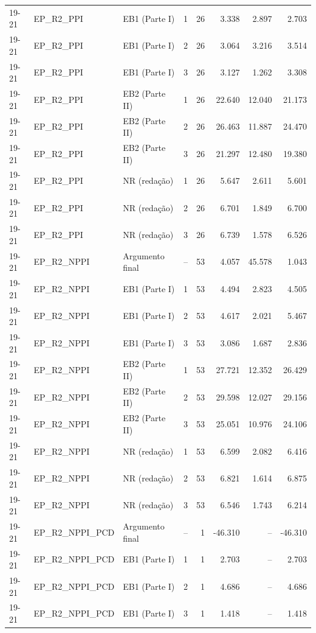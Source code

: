 \begin{longtable}{lllcrrrr}
19-21 & EP\_R2\_PPI & EB1 (Parte I) & 1 & 26 & 3.338 & 2.897 & 2.703 \\
19-21 & EP\_R2\_PPI & EB1 (Parte I) & 2 & 26 & 3.064 & 3.216 & 3.514 \\
19-21 & EP\_R2\_PPI & EB1 (Parte I) & 3 & 26 & 3.127 & 1.262 & 3.308 \\
19-21 & EP\_R2\_PPI & EB2 (Parte II) & 1 & 26 & 22.640 & 12.040 & 21.173 \\
19-21 & EP\_R2\_PPI & EB2 (Parte II) & 2 & 26 & 26.463 & 11.887 & 24.470 \\
19-21 & EP\_R2\_PPI & EB2 (Parte II) & 3 & 26 & 21.297 & 12.480 & 19.380 \\
19-21 & EP\_R2\_PPI & NR (redação) & 1 & 26 & 5.647 & 2.611 & 5.601 \\
19-21 & EP\_R2\_PPI & NR (redação) & 2 & 26 & 6.701 & 1.849 & 6.700 \\
19-21 & EP\_R2\_PPI & NR (redação) & 3 & 26 & 6.739 & 1.578 & 6.526 \\
19-21 & EP\_R2\_NPPI & Argumento final & -- & 53 & 4.057 & 45.578 & 1.043 \\
19-21 & EP\_R2\_NPPI & EB1 (Parte I) & 1 & 53 & 4.494 & 2.823 & 4.505 \\
19-21 & EP\_R2\_NPPI & EB1 (Parte I) & 2 & 53 & 4.617 & 2.021 & 5.467 \\
19-21 & EP\_R2\_NPPI & EB1 (Parte I) & 3 & 53 & 3.086 & 1.687 & 2.836 \\
19-21 & EP\_R2\_NPPI & EB2 (Parte II) & 1 & 53 & 27.721 & 12.352 & 26.429 \\
19-21 & EP\_R2\_NPPI & EB2 (Parte II) & 2 & 53 & 29.598 & 12.027 & 29.156 \\
19-21 & EP\_R2\_NPPI & EB2 (Parte II) & 3 & 53 & 25.051 & 10.976 & 24.106 \\
19-21 & EP\_R2\_NPPI & NR (redação) & 1 & 53 & 6.599 & 2.082 & 6.416 \\
19-21 & EP\_R2\_NPPI & NR (redação) & 2 & 53 & 6.821 & 1.614 & 6.875 \\
19-21 & EP\_R2\_NPPI & NR (redação) & 3 & 53 & 6.546 & 1.743 & 6.214 \\
19-21 & EP\_R2\_NPPI\_PCD & Argumento final & -- & 1 & -46.310 & -- & -46.310 \\
19-21 & EP\_R2\_NPPI\_PCD & EB1 (Parte I) & 1 & 1 & 2.703 & -- & 2.703 \\
19-21 & EP\_R2\_NPPI\_PCD & EB1 (Parte I) & 2 & 1 & 4.686 & -- & 4.686 \\
19-21 & EP\_R2\_NPPI\_PCD & EB1 (Parte I) & 3 & 1 & 1.418 & -- & 1.418 \\

\end{longtable}
